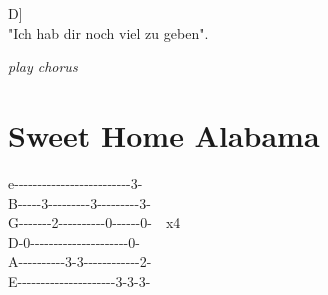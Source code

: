 \documentclass[
  letterpaper,
  a5paper]{memoir}
\begin{document}
\hspace*{0.333em}\hspace*{0.333em}\hspace*{0.333em}\hspace*{0.333em}\hspace*{0.333em}\hspace*{0.333em}\hspace*{0.333em}\hspace*{0.333em}\hspace*{0.333em}\hspace*{0.333em}\hspace*{0.333em}\hspace*{0.333em}\hspace*{0.333em}\hspace*{0.333em}\hspace*{0.333em}\hspace*{0.333em}\hspace*{0.333em}\hspace*{0.333em}\hspace*{0.333em}\hspace*{0.333em}\hspace*{0.333em}\hspace*{0.333em}\hspace*{0.333em}\hspace*{0.333em}\hspace*{0.333em}\hspace*{0.333em}\hspace*{0.333em}{[}D{]}\\
"Ich hab dir noch viel zu geben".

\emph{play chorus}

\hypertarget{sweet-home-alabama}{%
\chapter{Sweet Home Alabama}\label{sweet-home-alabama}}

e\textbar-\/-\/-\/-\/-\/-\/-\/-\/-\/-\/-\/-\/-\/-\/-\/-\/-\/-\/-\/-\/-\/-\/-\/-\/-3-\textbar{}\\
B\textbar-\/-\/-\/-\/-3-\/-\/-\/-\/-\/-\/-\/-\/-3-\/-\/-\/-\/-\/-\/-\/-\/-3-\textbar{}\\
G\textbar-\/-\/-\/-\/-\/-\/-2-\/-\/-\/-\/-\/-\/-\/-\/-\/-0-\/-\/-\/-\/-\/-0-\textbar~~x4\\
D-0-\/-\/-\/-\/-\/-\/-\/-\/-\/-\/-\/-\/-\/-\/-\/-\/-\/-\/-\/-\/-0-\textbar~~~~~\\
A\textbar-\/-\/-\/-\/-\/-\/-\/-\/-\/-3-3-\/-\/-\/-\/-\/-\/-\/-\/-\/-\/-\/-2-\textbar{}\\
E\textbar-\/-\/-\/-\/-\/-\/-\/-\/-\/-\/-\/-\/-\/-\/-\/-\/-\/-\/-\/-\/-3-3-3-\textbar{}
\end{document}
